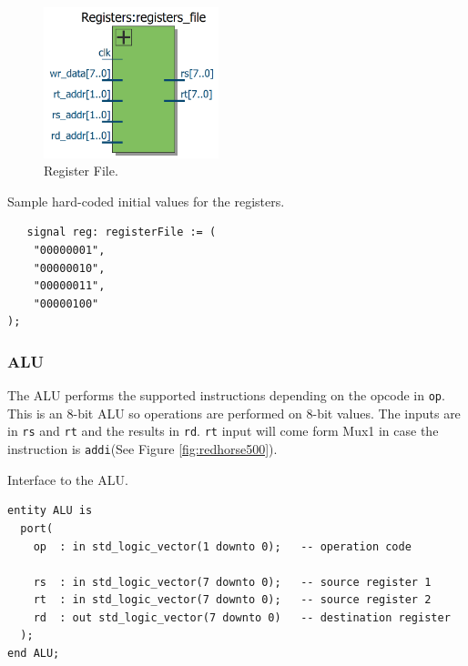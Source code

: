 \documentclass[a4paper, 11pt,oneside]{article}
\begin{document}
\begin{figure}[H]
	\begin{center}
	\includegraphics[width=2in]{rf.png}
	\caption{Register File.}
	\label{fig:rf} 
	\end{center}
\end{figure}

\begin{listing}[H]
\caption{Sample hard-coded initial values for the registers.}
\label{code:rf_values}
\begin{verbatim}
   signal reg: registerFile := (
    "00000001",
    "00000010",
    "00000011",
    "00000100"
);
\end{verbatim}
\end{listing}

\subsubsection{ALU}
The ALU performs the supported instructions depending on the opcode in 
\texttt{op}. This is an 8-bit ALU so operations are performed on 
8-bit values. The inputs are in \texttt{rs} and \texttt{rt} 
and the results in \texttt{rd}. \texttt{rt} input will come 
form Mux1 in case the instruction is \texttt{addi}(See Figure 
\ref{fig:redhorse500}).

\begin{listing}[H]
\caption{Interface to the ALU.}
\label{code:alu}
\begin{verbatim}
entity ALU is
  port(
    op  : in std_logic_vector(1 downto 0);   -- operation code

    rs  : in std_logic_vector(7 downto 0);   -- source register 1
    rt  : in std_logic_vector(7 downto 0);   -- source register 2
    rd  : out std_logic_vector(7 downto 0)   -- destination register
  );
end ALU;

\end{verbatim}
\end{listing}
\end{document}
